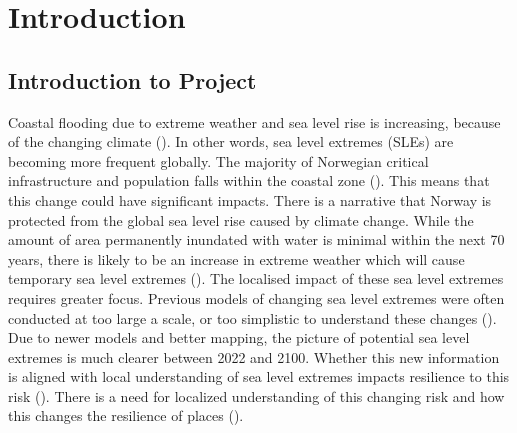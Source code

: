 




\chapter{Introduction}
\section{Introduction to Project}
Coastal flooding due to extreme weather and sea level rise is increasing, because of the changing climate (\cite{hoffken_effects_2020}).  In other words, sea level extremes (SLEs) are becoming more frequent globally. The majority of Norwegian critical infrastructure and population falls within the coastal zone (\cite{engebakken_construction_2022}). This means that this change could have significant impacts. There is a narrative that Norway is protected from the global sea level rise caused by climate change. While the amount of area permanently inundated with water is minimal within the next 70 years, there is likely to be an increase in extreme weather which will cause temporary sea level extremes (\cite{aunan_strong_2008}). The localised impact of these sea level extremes requires greater focus. Previous models of changing sea level extremes were often conducted at too large a scale, or too simplistic to understand these changes (\cite{hoffken_effects_2020}). Due to newer models and better mapping, the picture of potential sea level extremes is much clearer between 2022 and 2100. Whether this new information is aligned with local understanding of sea level extremes impacts resilience to this risk (\cite{setten_we_2019}).  There is a need for localized understanding of this changing risk and how this changes the resilience of places (\cite{rod_integrated_2012}).
